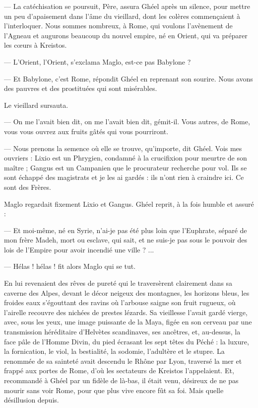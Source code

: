 \documentclass[a4paper, 11pt, oneside, polutonikogreek, french]{article}
\begin{document}
--- La catéchisation se poursuit, Père, assura Ghéel après un silence, pour mettre un peu d'apaisement dans l'âme du vieillard, dont les colères commençaient à l'interloquer. Nous sommes nombreux, à Rome, qui voulons l'avènement de l'Agneau et augurons beaucoup du nouvel empire, né en Orient, qui va préparer les cœurs à Kreistos.

--- L'Orient, l'Orient, s'exclama Maglo, est-ce pas Babylone ?

--- Et Babylone, c'est Rome, répondit Ghéel en reprenant son sourire. Nous avons des pauvres et des prostituées qui sont misérables.

Le vieillard sursauta.

--- On me l'avait bien dit, on me l'avait bien dit, gémit-il. Vous autres, de Rome, vous vous ouvrez aux fruits gâtés qui vous pourriront.

--- Nous prenons la semence où elle se trouve, qu'importe, dit Ghéel. Vois mes ouvriers : Lixio est un Phrygien, condamné à la crucifixion pour meurtre de son maître ; Gangus est un Campanien que le procurateur recherche pour vol. Ils se sont échappé des magistrats et je les ai gardés : ils n'ont rien à craindre ici. Ce sont des Frères.

Maglo regardait fixement Lixio et Gangus. Ghéel reprit, à la fois humble et assuré :

--- Et moi-même, né en Syrie, n'ai-je pas été plus loin que l'Euphrate, séparé de mon frère Madeh, mort ou esclave, qui sait, et ne suis-je pas sous le pouvoir des lois de l'Empire pour avoir incendié une ville ? ...

--- Hélas ! hélas ! fit alors Maglo qui se tut.

En lui revenaient des rêves de pureté qui le traversèrent clairement dans sa caverne des Alpes, devant le décor neigeux des montagnes, les horizons bleus, les froides eaux s'égouttant des ravins où l'arbouse saigne son fruit rugueux, où l'airelle recouvre des nichées de prestes lézards. Sa vieillesse l'avait gardé vierge, avec, sous les yeux, une image puissante de la Maya, figée en son cerveau par une transmission héréditaire d'Helvètes scandinaves, ses ancêtres, et, au-dessus, la face pâle de l'Homme Divin, du pied écrasant les sept têtes du Péché : la luxure, la fornication, le viol, la bestialité, la sodomie, l'adultère et le stupre. La renommée de sa sainteté avait descendu le Rhône par Lyon, traversé la mer et frappé aux portes de Rome, d'où les sectateurs de Kreistos l'appelaient. Et, recommandé à Ghéel par un fidèle de là-bas, il était venu, désireux de ne pas mourir sans voir Rome, pour que plus vive encore fût sa foi. Mais quelle désillusion depuis.
\end{document}
